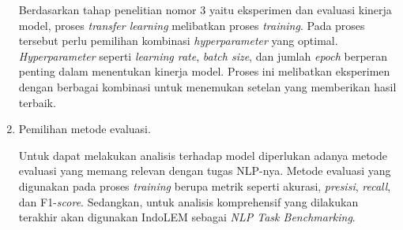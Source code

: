 \begin{enumerate}
    Berdasarkan tahap penelitian nomor 3 yaitu eksperimen dan evaluasi kinerja model, proses \textit{transfer learning} melibatkan proses \textit{training}. Pada proses tersebut perlu pemilihan kombinasi \textit{hyperparameter} yang optimal. \textit{Hyperparameter} seperti \textit{learning rate}, \textit{batch size}, dan jumlah \textit{epoch} berperan penting dalam menentukan kinerja model. Proses ini melibatkan eksperimen dengan berbagai kombinasi untuk menemukan setelan yang memberikan hasil terbaik. 
    
    \item Pemilihan metode evaluasi.
    
    Untuk dapat melakukan analisis terhadap model diperlukan adanya metode evaluasi yang memang relevan dengan tugas NLP-nya. Metode evaluasi yang digunakan pada proses \textit{training} berupa metrik seperti akurasi, \textit{presisi}, \textit{recall}, dan F1-\textit{score}. Sedangkan, untuk analisis komprehensif yang dilakukan terakhir akan digunakan IndoLEM sebagai \textit{NLP Task Benchmarking}.

\end{enumerate}